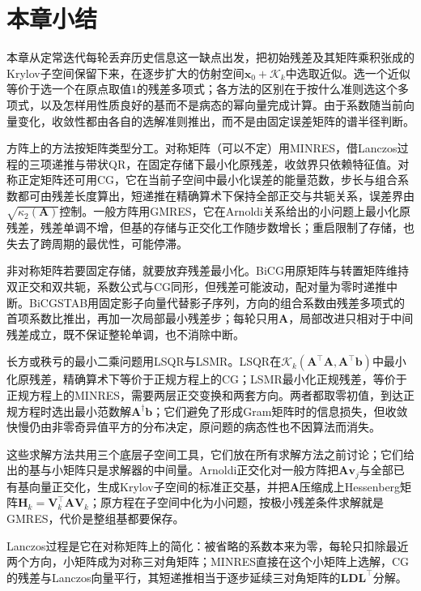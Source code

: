 \FloatBarrier
\section{本章小结}
\label{sec:krylov-methods-summary}

本章从定常迭代每轮丢弃历史信息这一缺点出发，把初始残差及其矩阵乘积张成的Krylov子空间保留下来，在逐步扩大的仿射空间$\bm x_0+\mathcal K_k$中选取近似。选一个近似等价于选一个在原点取值$1$的残差多项式；各方法的区别在于按什么准则选这个多项式，以及怎样用性质良好的基而不是病态的幂向量完成计算。由于系数随当前向量变化，收敛性都由各自的选解准则推出，而不是由固定误差矩阵的谱半径判断。

方阵上的方法按矩阵类型分工。对称矩阵（可以不定）用MINRES，借Lanczos过程的三项递推与带状QR，在固定存储下最小化原残差，收敛界只依赖特征值。对称正定矩阵还可用CG，它在当前子空间中最小化误差的能量范数，步长与组合系数都可由残差长度算出，短递推在精确算术下保持全部正交与共轭关系，误差界由$\sqrt{\kappa_2(\bm A)}$控制。一般方阵用GMRES，它在Arnoldi关系给出的小问题上最小化原残差，残差单调不增，但基的存储与正交化工作随步数增长；重启限制了存储，也失去了跨周期的最优性，可能停滞。

非对称矩阵若要固定存储，就要放弃残差最小化。BiCG用原矩阵与转置矩阵维持双正交和双共轭，系数公式与CG同形，但残差可能波动，配对量为零时递推中断。BiCGSTAB用固定影子向量代替影子序列，方向的组合系数由残差多项式的首项系数比推出，再加一次局部最小残差步；每轮只用$\bm A$，局部改进只相对于中间残差成立，既不保证整轮单调，也不消除中断。

长方或秩亏的最小二乘问题用LSQR与LSMR。LSQR在$\mathcal K_k(\bm A^\top\bm A,\bm A^\top\bm b)$中最小化原残差，精确算术下等价于正规方程上的CG；LSMR最小化正规残差，等价于正规方程上的MINRES，需要两层正交变换和两套方向。两者都取零初值，到达正规方程时选出最小范数解$\bm A^\dagger\bm b$；它们避免了形成Gram矩阵时的信息损失，但收敛快慢仍由非零奇异值平方的分布决定，原问题的病态性也不因算法而消失。

这些求解方法共用三个底层子空间工具，它们放在所有求解方法之前讨论；它们给出的基与小矩阵只是求解器的中间量。Arnoldi正交化对一般方阵把$\bm A\bm v_j$与全部已有基向量正交化，生成Krylov子空间的标准正交基，并把$\bm A$压缩成上Hessenberg矩阵$\bm H_k=\bm V_k^\top\bm A\bm V_k$；原方程在子空间中化为小问题，按极小残差条件求解就是GMRES，代价是整组基都要保存。

Lanczos过程是它在对称矩阵上的简化：被省略的系数本来为零，每轮只扣除最近两个方向，小矩阵成为对称三对角矩阵；MINRES直接在这个小矩阵上选解，CG的残差与Lanczos向量平行，其短递推相当于逐步延续三对角矩阵的$\bm L\bm D\bm L^\top$分解。

